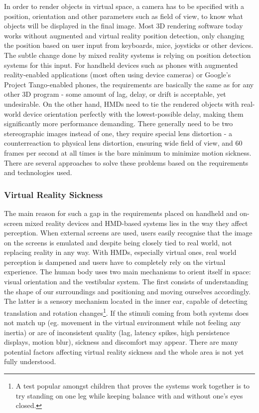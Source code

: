 \documentclass[12pt, a4paper]{article}
\begin{document}
In order to render objects in virtual space, a camera has to be specified with a position, orientation and other parameters such as field of view, to know what objects will be displayed in the final image. Most 3D rendering software today works without augmented and virtual reality position detection, only changing the position based on user input from keyboards, mice, joysticks or other devices. The subtle change done by mixed reality systems is relying on position detection systems for this input. For handheld devices such as phones with augmented reality-enabled applications (most often using device cameras) or Google’s Project Tango-enabled phones, the requirements are basically the same as for any other 3D program - some amount of lag, delay, or drift is acceptable, yet undesirable. On the other hand, HMDs need to tie the rendered objects with real-world device orientation perfectly with the lowest-possible delay, making them significantly more performance demanding. There generally need to be two stereographic images instead of one, they require special lens distortion - a counterreaction to physical lens distortion, ensuring wide field of view, and 60 frames per second at all times is the bare minimum to minimize motion sickness. There are several approaches to solve these problems based on the requirements and technologies used.

\subsubsection{Virtual Reality Sickness} 
The main reason for such a gap in the requirements placed on handheld and on-screen mixed reality devices and HMD-based systems lies in the way they affect perception. When external screens are used, users easily recognise that the image on the screens is emulated and despite being closely tied to real world, not replacing reality in any way. With HMDs, especially virtual ones, real world perception is dampened and users have to completely rely on the virtual experience. The human body uses two main mechanisms to orient itself in space: visual orientation and the vestibular system. The first consists of understanding the shape of our surroundings and positioning and moving ourselves accordingly. The latter is a sensory mechanism located in the inner ear, capable of detecting translation and rotation changes\footnote{A test popular amongst children that proves the systems work together is to try standing on one leg while keeping balance with and without one's eyes closed.}. If the stimuli coming from both systems does not match up (eg. movement in the virtual environment while not feeling any inertia) or are of inconsistent quality (lag, latency spikes, high persistence displays, motion blur), sickness and discomfort may appear. There are many potential factors affecting virtual reality sickness and the whole area is not yet fully understood.
\end{document}
